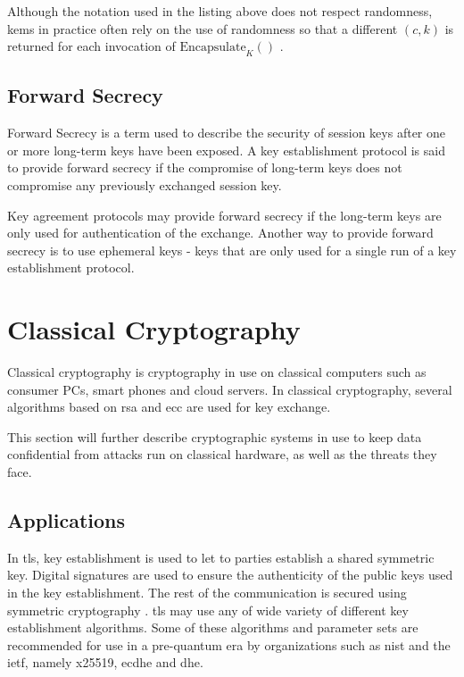 Although the notation used in the listing above does not respect randomness, \glspl{kem} in practice often rely on the use of randomness so that a different $(c,k)$ is returned for each invocation of $\text{Encapsulate}_K()$ \cite{boyd2020}. 

\subsection{Forward Secrecy}

Forward Secrecy is a term used to describe the security of session keys after one or more long-term keys have been exposed. A key establishment protocol is said to provide forward secrecy if the compromise of long-term keys does not compromise any previously exchanged session key\cite{boyd2020}.

Key agreement protocols may provide forward secrecy if the long-term keys are only used for authentication of the exchange. Another way to provide forward secrecy is to use ephemeral keys - keys that are only used for a single run of a key establishment protocol\cite{boyd2020}.

\section{Classical Cryptography}
\label{section:background:classical-cryptography}

Classical cryptography is cryptography in use on classical computers such as consumer PCs, smart phones and cloud servers. In classical cryptography, several algorithms based on \gls{rsa} and \gls{ecc} are used for key exchange.

This section will further describe cryptographic systems in use to keep data confidential from attacks run on classical hardware, as well as the threats they face.

\subsection{Applications}
\label{section:background:classical-cryptography:applications}

In \gls{tls}, key establishment is used to let to parties establish a shared symmetric key. Digital signatures are used to ensure the authenticity of the public keys used in the key establishment. The rest of the communication is secured using symmetric cryptography \cite{bernstein2017}. \gls{tls} may use any of wide variety of different key establishment algorithms. Some of these algorithms and parameter sets are recommended for use in a pre-quantum era by organizations such as \gls{nist} and the \gls{ietf}, namely \gls{x25519}\cite{rfc7748}, \gls{ecdhe}\cite{nist2019} and \gls{dhe}\cite{nist2019}.

